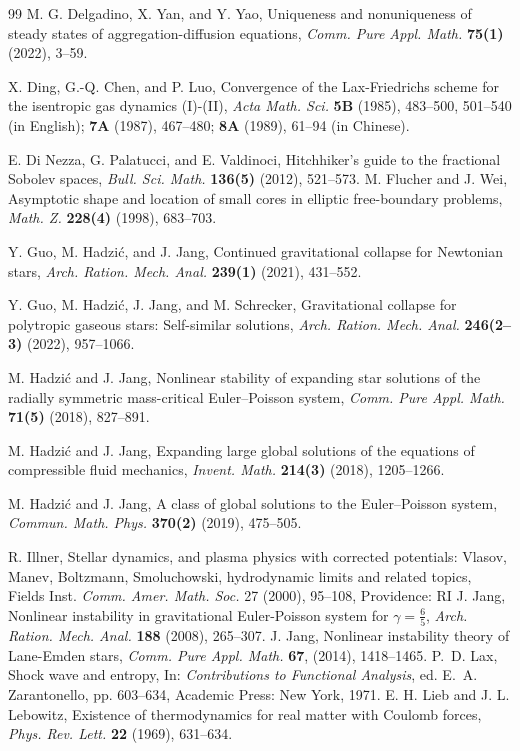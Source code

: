 \documentclass[reqno,11pt]{amsart}
\numberwithin{equation}{section}
\theoremstyle{definition}
\begin{document}
\begin{thebibliography}{99}
M. G. Delgadino, X. Yan, and Y. Yao,
Uniqueness and nonuniqueness of steady states of aggregation-diffusion equations,
{\em Comm. Pure Appl. Math.} {\bf 75(1)} (2022), 3--59.

 X. Ding, G.-Q. Chen, and P. Luo,
Convergence of the Lax-Friedrichs scheme for the isentropic gas dynamics
(I)-(II), {\it Acta Math. Sci.} {\bf 5B} (1985), 483--500, 501--540 (in English);
{\bf 7A} (1987), 467--480; {\bf 8A} (1989), 61--94 (in Chinese).

 E. Di Nezza, G. Palatucci, and E. Valdinoci,
 Hitchhiker's guide to the fractional Sobolev spaces,
 {\em Bull. Sci. Math.} {\bf 136(5)} (2012), 521--573.
 M. Flucher and J. Wei,
 Asymptotic shape and location of small cores in elliptic free-boundary problems,
 {\em Math. Z.} {\bf 228(4)} (1998), 683--703.

Y. Guo, M. Hadzi\'c, and J. Jang,
Continued gravitational collapse for Newtonian stars,
{\em Arch. Ration. Mech. Anal.} {\bf 239(1)} (2021), 431--552.

Y. Guo, M. Hadzi\'c, J. Jang, and M. Schrecker,
Gravitational collapse for polytropic gaseous stars: Self-similar solutions,
{\em Arch. Ration. Mech. Anal.} {\bf 246(2--3)} (2022), 957--1066.

M. Hadzi\'c and J. Jang,
Nonlinear stability of expanding star solutions of the radially symmetric
mass-critical Euler--Poisson system,
{\em Comm. Pure Appl. Math.} {\bf 71(5)} (2018), 827--891.

M. Hadzi\'c and J. Jang,
Expanding large global solutions of the equations of compressible fluid mechanics,
{\em Invent. Math.} {\bf 214(3)} (2018), 1205--1266.

M. Hadzi\'c and J. Jang,
A class of global solutions to the Euler--Poisson system,
{\em Commun. Math. Phys.} {\bf 370(2)} (2019), 475--505.

 R. Illner, Stellar dynamics, and plasma physics with corrected potentials:
 Vlasov, Manev, Boltzmann, Smoluchowski, hydrodynamic limits and related topics, 
 Fields Inst. {\em Comm. Amer. Math. Soc.} 27 (2000), 95--108,  Providence: RI
J. Jang, Nonlinear instability in gravitational Euler-Poisson system for $\gamma=\frac{6}{5}$, 
{\em Arch. Ration. Mech. Anal.} {\bf 188} (2008), 265--307.
J. Jang, Nonlinear instability theory of Lane-Emden stars, 
{\em Comm. Pure Appl. Math.} {\bf 67}, (2014), 1418--1465.
 P.~D. Lax, Shock wave and entropy, In: {\it Contributions to
 	Functional Analysis}, ed. E.~A. Zarantonello, pp. 603--634,
 Academic Press: New York, 1971.
 E. H. Lieb and J. L. Lebowitz, Existence of thermodynamics for real matter with Coulomb forces, 
 {\em Phys. Rev. Lett.} {\bf 22} (1969), 631--634.


\end{thebibliography}
\end{document}
